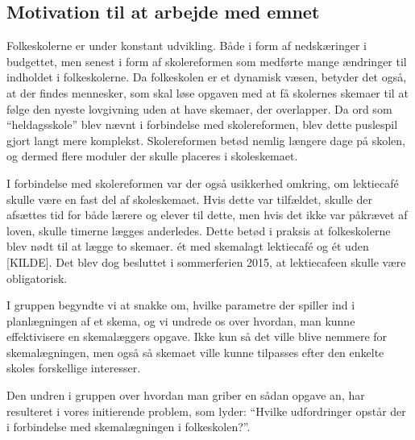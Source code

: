 \subsection{Motivation til at arbejde med emnet}
Folkeskolerne er under konstant udvikling. Både i form af nedskæringer i budgettet, men senest i form af skolereformen som medførte mange ændringer til indholdet i folkeskolerne. Da folkeskolen er et dynamisk væsen, betyder det også, at der findes mennesker, som skal løse opgaven med at få skolernes skemaer til at følge den nyeste lovgivning uden at have skemaer, der overlapper. Da ord som ``heldagsskole'' blev nævnt i forbindelse med skolereformen, blev dette puslespil gjort langt mere komplekst. Skolereformen betød nemlig længere dage på skolen, og dermed flere moduler der skulle placeres i skoleskemaet.

I forbindelse med skolereformen var der også usikkerhed omkring, om lektiecaf\'e skulle være en fast del af skoleskemaet. Hvis dette var tilfældet, skulle der afsættes tid for både lærere og elever til dette, men hvis det ikke var påkrævet af loven, skulle timerne lægges anderledes. Dette betød i praksis at folkeskolerne blev nødt til at lægge to skemaer. ét med skemalagt lektiecaf\'e og ét uden [KILDE]. Det blev dog besluttet i sommerferien 2015, at lektiecafeen skulle være obligatorisk\cite{Lektiecafe}.

I gruppen begyndte vi at snakke om, hvilke parametre der spiller ind i planlægningen af et skema, og vi undrede os over hvordan, man kunne effektivisere en skemalæggers opgave. Ikke kun så det ville blive nemmere for skemalægningen, men også så skemaet ville kunne tilpasses efter den enkelte skoles forskellige interesser.

Den undren i gruppen over hvordan man griber en sådan opgave an, har resulteret i vores initierende problem, som lyder: ``Hvilke udfordringer opstår der i forbindelse med skemalægningen i folkeskolen?''.


